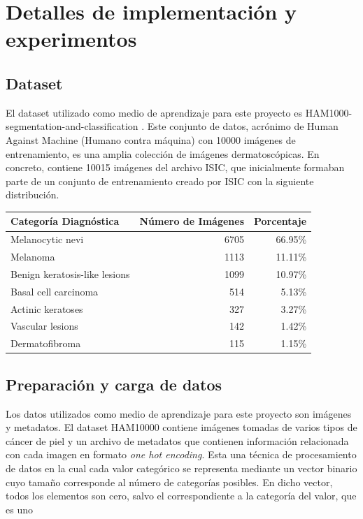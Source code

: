 \chapter{Detalles de implementación y experimentos}\label{chapter:implementation}

\section{Dataset}

El dataset utilizado como medio de aprendizaje para este proyecto es HAM1000-segmentation-and-classification . Este conjunto de datos, acrónimo de Human Against Machine (Humano contra máquina) con 10000 imágenes de entrenamiento, es una amplia colección de imágenes dermatoscópicas. En concreto, contiene 10015 imágenes del archivo ISIC, que inicialmente formaban parte de un conjunto de entrenamiento creado por ISIC  con la siguiente distribución.\\

\begin{tabular}{lrr}
   \hline
   \textbf{Categoría Diagnóstica} & \textbf{Número de Imágenes} & \textbf{Porcentaje} \\
   \hline
   Melanocytic nevi               & 6705                        & 66.95\%             \\
   Melanoma                       & 1113                        & 11.11\%             \\
   Benign keratosis-like lesions  & 1099                        & 10.97\%             \\
   Basal cell carcinoma           & 514                         & 5.13\%              \\
   Actinic keratoses              & 327                         & 3.27\%              \\
   Vascular lesions               & 142                         & 1.42\%              \\
   Dermatofibroma                 & 115                         & 1.15\%              \\
   \hline
   \end{tabular}

\section{Preparación y carga de datos}

Los datos utilizados como medio de aprendizaje para este proyecto son imágenes y metadatos. El dataset HAM10000 contiene imágenes tomadas de varios tipos de cáncer de piel y un archivo de metadatos que contienen información relacionada con cada imagen en formato \textit{one hot encoding}. Esta una técnica de procesamiento de datos en la cual cada valor categórico se representa mediante un vector binario cuyo tamaño corresponde al número de categorías posibles. En dicho vector, todos los elementos son cero, salvo el correspondiente a la categoría del valor, que es uno 

